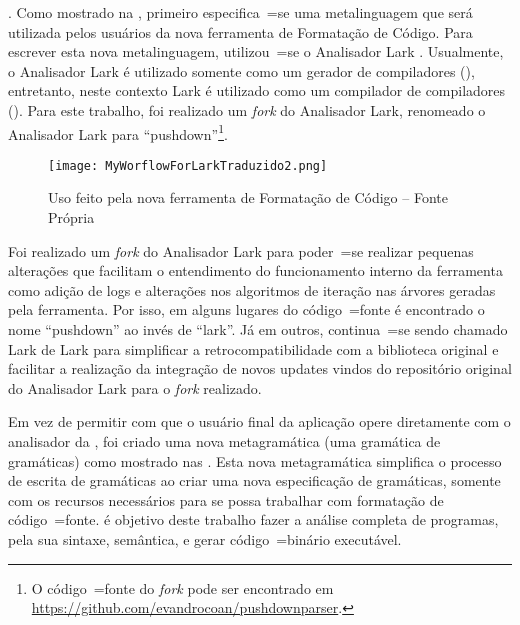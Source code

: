 .
Como mostrado na ,
primeiro especifica~=se uma metalinguagem que será utilizada pelos usuários da nova ferramenta de Formatação de Código.
Para escrever esta nova metalinguagem,
utilizou~=se o Analisador Lark \cite{larkContextualLexer}.
Usualmente,
o Analisador Lark é utilizado somente como um gerador de compiladores (),
entretanto,
neste contexto Lark é utilizado como um compilador de compiladores ().
Para este trabalho,
foi realizado um \textit{fork} \cite{overviewOfGitHubForks,mayTheForkBeWithYou,collaborationAmongGitHubUsers} do Analisador Lark,
renomeado o Analisador Lark para ``pushdown''\footnote{%
O código~=fonte do \textit{fork} pode ser encontrado em \url{https://github.com/evandrocoan/pushdownparser}.
}.
\begin{figure}[h]
\centering
\texttt{[image: MyWorflowForLarkTraduzido2.png]}
\caption[Uso feito pela nova ferramenta de Formatação de Código]{Uso feito pela nova ferramenta de Formatação de Código -- Fonte Própria \cite{larkErrorRecovery}}
\label{MyWorflowForLarkTraduzido2}
\end{figure}

Foi realizado um \textit{fork} do Analisador Lark para poder~=se realizar pequenas alterações que facilitam o entendimento do funcionamento interno da ferramenta como adição de logs e
alterações nos algoritmos de iteração nas árvores geradas pela ferramenta.
Por isso,
em alguns lugares do código~=fonte é encontrado o nome ``pushdown'' ao invés de ``lark''.
Já em outros,
continua~=se sendo chamado Lark de Lark para simplificar a retrocompatibilidade com a biblioteca original e
facilitar a realização da integração de novos updates vindos do repositório original do Analisador Lark para o \textit{fork} realizado.

Em vez de permitir com que o usuário final da aplicação opere diretamente com o analisador da ,
foi criado uma nova metagramática (uma gramática de gramáticas) como mostrado nas .
Esta nova metagramática simplifica o processo de escrita de gramáticas ao criar uma nova especificação de gramáticas,
somente com os recursos necessários para se possa trabalhar com formatação de código~=fonte.
é objetivo deste trabalho fazer a análise completa de programas,
pela sua sintaxe, semântica,
e gerar código~=binário executável.

